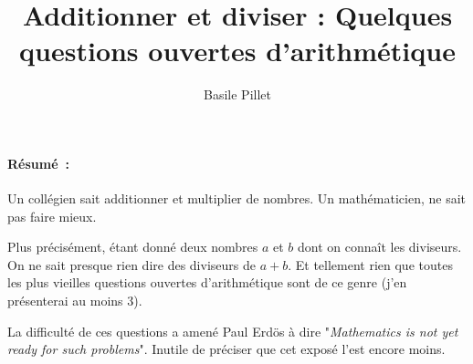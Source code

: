 \documentclass[10pt,a4paper]{article}
\author{Basile Pillet}
\title{Additionner et diviser : Quelques questions ouvertes d'arithmétique}
\date{}
\begin{document}
\maketitle
\paragraph{Résumé~:}
Un collégien sait additionner et multiplier de nombres. Un mathématicien, ne sait pas faire mieux.

Plus précisément, étant donné deux nombres $a$ et $b$ dont on connaît les diviseurs. On ne sait presque rien dire des diviseurs de $a+b$. Et tellement rien que toutes les plus vieilles questions ouvertes d'arithmétique sont de ce genre (j'en présenterai au moins $3$). 

La difficulté de ces questions a amené Paul Erdös à dire "\textit{Mathematics is not yet ready for such problems}". Inutile de préciser que cet exposé l'est encore moins.
\end{document}
